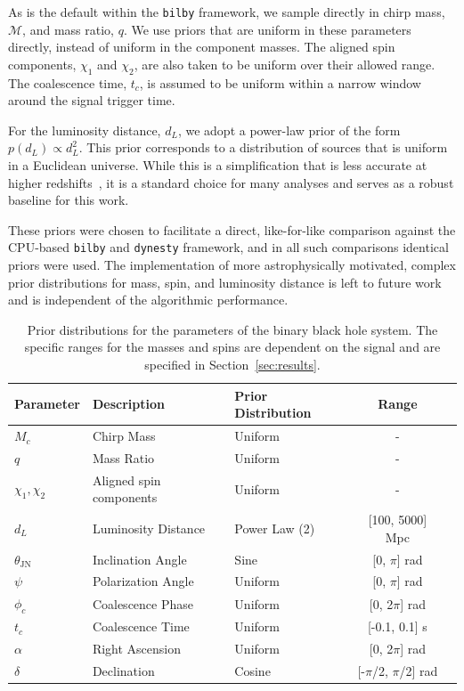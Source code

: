 \documentclass[fleqn,usenatbib]{mnras}
\begin{document}
As is the default within the \texttt{bilby} framework, we sample directly in chirp mass, $\mathcal{M}$, and
mass ratio, $q$. We use priors that are uniform in these parameters directly, instead of uniform in the component masses. 
The aligned spin components, $\chi_1$ and $\chi_2$, are also taken to be uniform over
their allowed range. The coalescence time, $t_c$, is assumed to be uniform
within a narrow window around the signal trigger time.

For the luminosity distance, $d_L$, we adopt a power-law prior of the
form $p(d_L) \propto d_L^2$. This prior corresponds to a distribution of
sources that is uniform in a Euclidean universe. While this is a
simplification that is less accurate at higher redshifts~\citep{bilby_validation}, it is a
standard choice for many analyses and serves as a robust baseline for
this work.

These priors were chosen to facilitate a direct, like-for-like
comparison against the CPU-based \texttt{bilby} and \texttt{dynesty}
framework, and in all such comparisons identical priors were used. The
implementation of more astrophysically motivated, complex prior
distributions for mass, spin, and luminosity distance is left to
future work and is independent of the algorithmic performance.

\begin{table}
\setlength{\tabcolsep}{3pt} %
\centering
\caption{Prior distributions for the parameters of the binary black hole
system. The specific ranges for the masses and spins
 are dependent on the signal and are specified in Section~\ref{sec:results}.}
\label{tab:priors}
\begin{tabular}{l l l c c}
\hline
\hline
\textbf{Parameter} & \textbf{Description} & \textbf{Prior Distribution} & \textbf{Range}\\
\hline
$M_c$ & Chirp Mass & Uniform & - \\
$q$ & Mass Ratio & Uniform & - \\
$\chi_1, \chi_2$ & Aligned spin components & Uniform & - \\
$d_L$ & Luminosity Distance & Power Law (2) & [100, 5000] Mpc \\
$\theta_{\textrm{JN}}$ & Inclination Angle & Sine & [0, $\pi$] rad \\
$\psi$ & Polarization Angle & Uniform & [0, $\pi$] rad \\
$\phi_c$ & Coalescence Phase & Uniform & [0, 2$\pi$] rad \\
$t_c$ & Coalescence Time & Uniform & [-0.1, 0.1] s\\
$\alpha$ & Right Ascension & Uniform & [0, 2$\pi$] rad \\
$\delta$ & Declination & Cosine & [-$\pi$/2, $\pi$/2] rad \\
\hline
\hline
\end{tabular}
\end{table}
\end{document}
